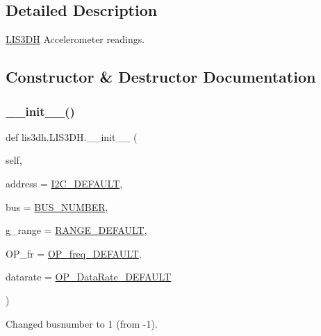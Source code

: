 \subsection{Detailed Description}
\mbox{\hyperlink{classlis3dh_1_1_l_i_s3_d_h}{L\+I\+S3\+DH}} Accelerometer readings. 



\subsection{Constructor \& Destructor Documentation}
\mbox{\label{classlis3dh_1_1_l_i_s3_d_h_a9097ea52b7af8361987dee7b6ab1d3f1}} 
\subsubsection{\texorpdfstring{\+\_\+\+\_\+init\+\_\+\+\_\+()}{\_\_init\_\_()}}
{\footnotesize\ttfamily def lis3dh.\+L\+I\+S3\+D\+H.\+\_\+\+\_\+init\+\_\+\+\_\+ (\begin{DoxyParamCaption}\item[{}]{self,  }\item[{}]{address = {\ttfamily \mbox{\hyperlink{classlis3dh_1_1_l_i_s3_d_h_af6b66a20ed2112e95c14ce7b58697d9f}{I2\+C\+\_\+\+D\+E\+F\+A\+U\+LT}}},  }\item[{}]{bus = {\ttfamily \mbox{\hyperlink{classlis3dh_1_1_l_i_s3_d_h_a6dd4e8c65978e98d0f3765ff58552fc8}{B\+U\+S\+\_\+\+N\+U\+M\+B\+ER}}},  }\item[{}]{g\+\_\+range = {\ttfamily \mbox{\hyperlink{classlis3dh_1_1_l_i_s3_d_h_a022306eeafee6751efac48439f7d1ef1}{R\+A\+N\+G\+E\+\_\+\+D\+E\+F\+A\+U\+LT}}},  }\item[{}]{O\+P\+\_\+fr = {\ttfamily \mbox{\hyperlink{classlis3dh_1_1_l_i_s3_d_h_ac3e1a74a98644f0d2c87f2d381b011e2}{O\+P\+\_\+freq\+\_\+\+D\+E\+F\+A\+U\+LT}}},  }\item[{}]{datarate = {\ttfamily \mbox{\hyperlink{classlis3dh_1_1_l_i_s3_d_h_a5a7e6620a64989808fcecbc055b29cb9}{O\+P\+\_\+\+Data\+Rate\+\_\+\+D\+E\+F\+A\+U\+LT}}} }\end{DoxyParamCaption})}



Changed busnumber to 1 (from -\/1). 

